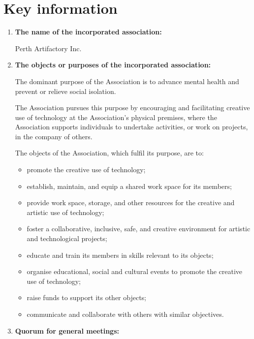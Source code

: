 \documentclass[../constitution.tex]{subfiles}
\begin{document}
\part*{Key information} \label{key-information}

\begin{enumerate}[label=\Alph*.]
  \item \textbf{The name of the incorporated association:} \label{key-info-name-of-association}
  
  Perth Artifactory Inc.
  
  \item \textbf{The objects or purposes of the incorporated association:} \label{key-info-objects-purposes}
  



  The dominant purpose of the Association is to advance mental health and prevent or relieve social isolation.

  The Association pursues this purpose by encouraging and facilitating creative use of technology at the Association's physical premises, where the Association supports individuals to undertake activities, or work on projects, in the company of others.
  
  The objects of the Association, which fulfil its purpose, are to:


    \begin{itemize}
    \item promote the creative use of technology;
    \item establish, maintain, and equip a shared work space for its members;
    \item provide work space, storage, and other resources for the creative and artistic use of technology;
    \item foster a collaborative, inclusive, safe, and creative environment for artistic and technological projects;
    \item educate and train its members in skills relevant to its objects;
    \item organise educational, social and cultural events to promote the creative use of technology;
    \item raise funds to support its other objects;
    \item communicate and collaborate with others with similar objectives.
    \end{itemize}
  
  \item \textbf{Quorum for general meetings:} \label{key-info-quorum-for-general-meetings}
  

\end{enumerate}
\end{document}
